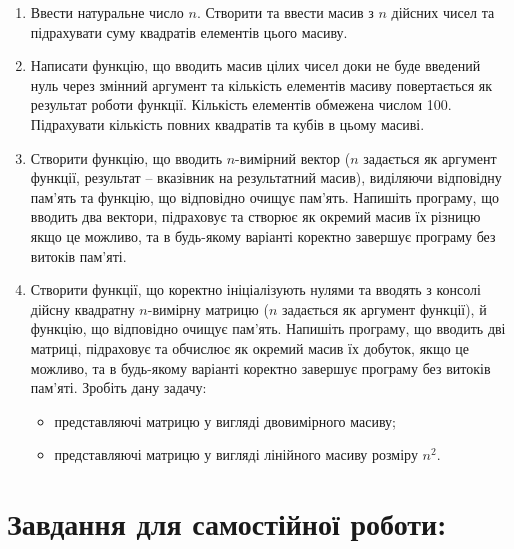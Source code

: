 \documentclass[a5paper,titlepage,openany,twoside,
]
{book_unv}%
\begin{document}
\begin{enumerate}
\def\labelenumi{\arabic{enumi})}
\item
  Ввести натуральне число $n$. Створити та ввести масив з $n$ дійсних чисел та
  підрахувати суму квадратів елементів цього масиву. 

\item
  Написати функцію, що вводить масив цілих чисел доки не буде введений нуль
  через змінний аргумент та кількість елементів масиву повертається як
  результат роботи функції. Кількість елементів обмежена числом 100.
  Підрахувати кількість повних квадратів та кубів в цьому масиві.
\item
  Створити функцію, що вводить $n$-вимірний вектор ($n$
  задається як аргумент функції, результат -- вказівник на результатний масив),
 виділяючи відповідну пам'ять та функцію, що відповідно очищує пам'ять. 
 Напишіть програму, що вводить два вектори, підраховує та створює як окремий масив їх
  різницю якщо це можливо, та в будь-якому варіанті коректно
  завершує програму без витоків пам'яті.
\item
  Створити функції, що коректно ініціалізують нулями та вводять з консолі 
дійсну квадратну $n$-вимірну матрицю ($n$ задається як аргумент функції), й
  функцію, що відповідно очищує пам'ять. Напишіть програму, що вводить
  дві матриці, підраховує та обчислює як окремий масив їх добуток, якщо
  це можливо, та в будь-якому варіанті коректно завершує програму без
  витоків пам'яті. Зробіть дану задачу:
  \begin{itemize}
  \item
представляючі матрицю у вигляді двовимірного масиву;
  \item
представляючі матрицю у вигляді лінійного масиву розміру $n^{2}$.
 \end{itemize}

\end{enumerate}

\section{Завдання для самостійної роботи:}
\end{document}
